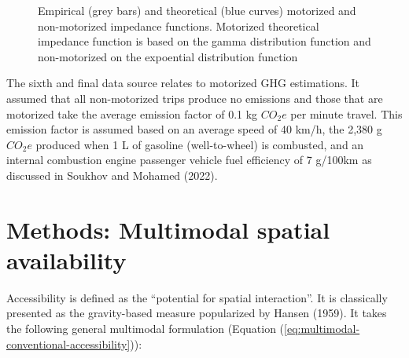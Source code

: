 \documentclass[
default
]{sn-jnl}
\begin{document}
\begin{figure}[H]


\caption{\label{fig-Fig4}Empirical (grey bars) and theoretical (blue
curves) motorized and non-motorized impedance functions. Motorized
theoretical impedance function is based on the gamma distribution
function and non-motorized on the expoential distribution function}

\end{figure}%

The sixth and final data source relates to motorized GHG estimations. It
assumed that all non-motorized trips produce no emissions and those that
are motorized take the average emission factor of 0.1 kg \(CO_{2}e\) per
minute travel. This emission factor is assumed based on an average speed
of 40 km/h, the 2,380 g \(CO_{2}e\) produced when 1 L of gasoline
(well-to-wheel) is combusted, and an internal combustion engine
passenger vehicle fuel efficiency of 7 g/100km as discussed in Soukhov
and Mohamed (2022).

\section{Methods: Multimodal spatial
availability}\label{methods-multimodal-spatial-availability}

Accessibility is defined as the ``potential for spatial interaction''.
It is classically presented as the gravity-based measure popularized by
Hansen (1959). It takes the following general multimodal formulation
(Equation (\ref{eq:multimodal-conventional-accessibility})):
\end{document}
